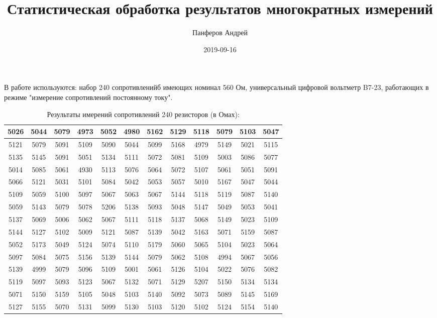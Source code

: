 \documentclass{article}
\title{Статистическая обработка результатов многократных измерений}
\date{2019-09-16}
\author{Панферов Андрей}
\begin{document}
\maketitle
\newpage
{}
В работе используются: набор 240 сопротивленийб имеющих номинал 560 Ом, универсальный цифровой вольтметр B7-23, работающих в режиме "измерение сопротивлений постоянному току".

\begin{table}[h!]
\begin{center}
\caption{Результаты имерений сопротивлений 240 резисторов (в Омах):}
\begin{tabular}{||c|c|c|c|c|c|c|c|c|c|c|c||}
\hline
5026 & 5044 & 5079 & 4973 & 5052 & 4980 & 5162 & 5129 & 5118 & 5079 & 5103 & 5047 \\
\hline
5121 & 5079 & 5091 & 5109 & 5090 & 5044 & 5099 & 5168 & 4979 & 5149 & 5021 & 5115 \\
\hline
5135 & 5145 & 5091 & 5051 & 5134 & 5111 & 5072 & 5081 & 5109 & 5003 & 5086 & 5077 \\
\hline
5014 & 5085 & 5061 & 4930 & 5113 & 5076 & 5064 & 5072 & 5107 & 5061 & 5051 & 5091 \\
\hline
5066 & 5121 & 5031 & 5101 & 5084 & 5042 & 5053 & 5057 & 5010 & 5167 & 5047 & 5044 \\
\hline
5109 & 5059 & 5100 & 5097 & 5067 & 5063 & 5067 & 5144 & 5118 & 5119 & 5087 & 5140 \\
\hline
5059 & 5143 & 5079 & 5078 & 5206 & 5138 & 5093 & 5048 & 5147 & 5049 & 5053 & 5041 \\
\hline 
5137 & 5069 & 5006 & 5062 & 5067 & 5111 & 5118 & 5137 & 5068 & 5149 & 5023 & 5109 \\
\hline 
5144 & 5127 & 5102 & 5009 & 5121 & 5087 & 5139 & 5042 & 5163 & 5071 & 5159 & 5087 \\
\hline 
5052 & 5173 & 5049 & 5124 & 5074 & 5110 & 5179 & 5060 & 5065 & 5104 & 5023 & 5064 \\
\hline 
5097 & 5084 & 5075 & 5156 & 5139 & 5144 & 5079 & 5062 & 5108 & 4994 & 5067 & 5056 \\
\hline 
5139 & 4999 & 5079 & 5096 & 5109 & 5001 & 5061 & 5126 & 5104 & 5022 & 5076 & 5082 \\
\hline 
5119 & 5097 & 5093 & 5123 & 5067 & 5132 & 5071 & 5129 & 5207 & 5150 & 5134 & 5134 \\
\hline 
5071 & 5150 & 5159 & 5105 & 5048 & 5103 & 5140 & 5092 & 5073 & 5089 & 5145 & 5169 \\
\hline 
5127 & 5155 & 5070 & 5131 & 5099 & 5130 & 5103 & 5120 & 5102 & 5124 & 5154 & 5140 \\

\end{tabular}
\end{center}
\end{table}
\end{document}
